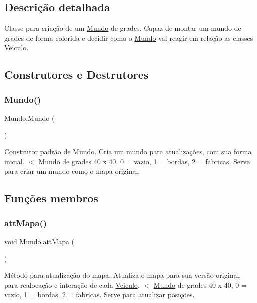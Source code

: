 \subsection{Descrição detalhada}
Classe para criação de um \mbox{\hyperlink{class_mundo}{Mundo}} de grades. Capaz de montar um mundo de grades de forma colorida e decidir como o \mbox{\hyperlink{class_mundo}{Mundo}} vai reagir em relação as classes \mbox{\hyperlink{class_veiculo}{Veiculo}}. 

\subsection{Construtores e Destrutores}
\mbox{\label{class_mundo_ae3801a0a633ad3475456c67639561105}} 
\subsubsection{\texorpdfstring{Mundo()}{Mundo()}}
{\footnotesize\ttfamily Mundo.\+Mundo (\begin{DoxyParamCaption}{ }\end{DoxyParamCaption})\hspace{0.3cm}{\ttfamily [inline]}}

Construtor padrão de \mbox{\hyperlink{class_mundo}{Mundo}}. Cria um mundo para atualizações, com sua forma inicial. $<$ \mbox{\hyperlink{class_mundo}{Mundo}} de grades 40 x 40, 0 = vazio, 1 = bordas, 2 = fabricas. Serve para criar um mundo como o mapa original. 

\subsection{Funções membros}
\mbox{\label{class_mundo_af5231bba26317e2ff2eb04e9bf0ac495}} 
\subsubsection{\texorpdfstring{att\+Mapa()}{attMapa()}}
{\footnotesize\ttfamily void Mundo.\+att\+Mapa (\begin{DoxyParamCaption}{ }\end{DoxyParamCaption})\hspace{0.3cm}{\ttfamily [inline]}}

Método para atualização do mapa. Atualiza o mapa para sua versão original, para realocação e interação de cada \mbox{\hyperlink{class_veiculo}{Veiculo}}. $<$ \mbox{\hyperlink{class_mundo}{Mundo}} de grades 40 x 40, 0 = vazio, 1 = bordas, 2 = fabricas. Serve para atualizar posições. \mbox{\label{class_mundo_a6992f445c8947937e73492a0ac6895fa}} 

